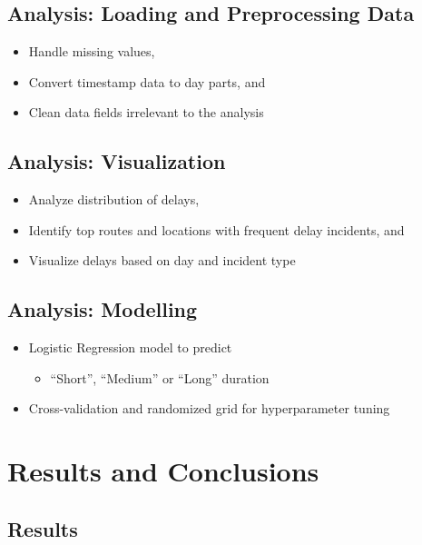 \documentclass[
  letterpaper,
  DIV=11,
  numbers=noendperiod]{scrartcl}
\providecommand{\tightlist}{%
  \setlength{\itemsep}{0pt}\setlength{\parskip}{0pt}}\usepackage{longtable,booktabs,array}
\begin{document}
\subsection{Analysis: Loading and Preprocessing
Data}\label{analysis-loading-and-preprocessing-data}

\begin{itemize}
\tightlist
\item
  Handle missing values,
\item
  Convert timestamp data to day parts, and
\item
  Clean data fields irrelevant to the analysis
\end{itemize}

\subsection{Analysis: Visualization}\label{analysis-visualization}

\begin{itemize}
\tightlist
\item
  Analyze distribution of delays,
\item
  Identify top routes and locations with frequent delay incidents, and
\item
  Visualize delays based on day and incident type
\end{itemize}

\subsection{Analysis: Modelling}\label{analysis-modelling}

\begin{itemize}
\tightlist
\item
  Logistic Regression model to predict

  \begin{itemize}
  \tightlist
  \item
    ``Short'', ``Medium'' or ``Long'' duration
  \end{itemize}
\item
  Cross-validation and randomized grid for hyperparameter tuning
\end{itemize}

\section{Results and Conclusions}\label{results-and-conclusions}

\subsection{Results}\label{results}
\end{document}
